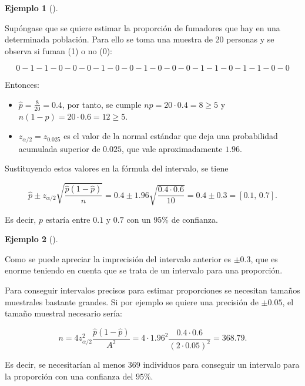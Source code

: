 \documentclass[
  a4paper,
]{scrreport}
\providecommand{\tightlist}{%
  \setlength{\itemsep}{0pt}\setlength{\parskip}{0pt}}\usepackage{longtable,booktabs,array}
\theoremstyle{definition}
\theoremstyle{definition}
\newtheorem{example}{Ejemplo}[chapter]
\theoremstyle{plain}
\theoremstyle{remark}
\begin{document}
\begin{example}[]\protect\hypertarget{exm-intervalo-confianza-proporcion}{}\label{exm-intervalo-confianza-proporcion}

Supóngase que se quiere estimar la proporción de fumadores que hay en
una determinada población. Para ello se toma una muestra de 20 personas
y se observa si fuman (1) o no (0):

\[
0 - 1 - 1 - 0 - 0 - 0 - 1 - 0 - 0 - 1 - 0 - 0 - 0 - 1 - 1- 0 - 1 - 1 - 0 - 0
\]

Entonces:

\begin{itemize}
\tightlist
\item
  \(\hat p=\frac{8}{20}=0.4\), por tanto, se cumple
  \(np=20\cdot 0.4 = 8\geq 5\) y \(n(1-p)=20\cdot 0.6= 12\geq 5\).
\item
  \(z_{\alpha/2}=z_{0.025}\) es el valor de la normal estándar que deja
  una probabilidad acumulada superior de \(0.025\), que vale
  aproximadamente \(1.96\).
\end{itemize}

Sustituyendo estos valores en la fórmula del intervalo, se tiene

\[
\hat{p}\pm z_{\alpha/2}\sqrt{\frac{\hat{p}(1-\hat{p})}{n}} = 0.4\pm 1.96\sqrt{\frac{0.4\cdot 0.6}{10}} = 0.4\pm  0.3 = \left[0.1,\,0.7\right].
\]

Es decir, \(p\) estaría entre \(0.1\) y \(0.7\) con un 95\% de
confianza.

\end{example}

\begin{example}[]\protect\hypertarget{exm-tamaño-muestral-intervalo-confianza-proporcion}{}\label{exm-tamaño-muestral-intervalo-confianza-proporcion}

Como se puede apreciar la imprecisión del intervalo anterior es
\(\pm 0.3\), que es enorme teniendo en cuenta que se trata de un
intervalo para una proporción.

Para conseguir intervalos precisos para estimar proporciones se
necesitan tamaños muestrales bastante grandes. Si por ejemplo se quiere
una precisión de \(\pm 0.05\), el tamaño muestral necesario sería:

\[
n= 4 z_{\alpha/2}^2\frac{\hat{p}(1-\hat{p})}{A^2}=4\cdot 1.96^2\frac{0.4\cdot 0.6}{(2\cdot0.05)^2}= 368.79.
\]

Es decir, se necesitarían al menos 369 individuos para conseguir un
intervalo para la proporción con una confianza del \(95\%\).

\end{example}
\end{document}
